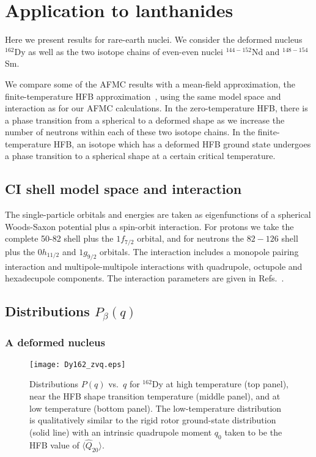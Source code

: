 \documentclass[prc,twocolumn,aps,showpacs,floatfix,nofootinbib,letterpaper,preprintnumbers]{revtex4-1}
\begin{document}
\section{Application to lanthanides}\label{application}

Here we present results for rare-earth nuclei. We consider the deformed nucleus $^{162}$Dy as well as the two isotope chains of even-even nuclei $^{144-152}$Nd and $^{148-154}$Sm.

 We compare some of the AFMC results with a mean-field approximation, the finite-temperature HFB approximation~\cite{go81,ta81}, using the same model space and interaction as for our AFMC calculations. In the zero-temperature HFB, there is a phase transition from a spherical to a deformed shape as we increase the number of neutrons within each of these two isotope chains. In the finite-temperature HFB, an isotope which has a deformed HFB ground state undergoes a phase transition to a spherical shape at a certain critical temperature. 
 
\subsection{CI shell model space and interaction}
 
The single-particle orbitals and energies are taken as eigenfunctions of a spherical Woods-Saxon potential plus a
spin-orbit interaction. For protons we take the complete 50-82 
shell plus the $1f_{7/2}$ orbital, and for neutrons the $82-126$ shell plus
the $0h_{11/2}$ and $1g_{9/2}$ orbitals.  The interaction includes a monopole pairing interaction and multipole-multipole interactions with quadrupole, octupole and hexadecupole components.  The interaction parameters are given in Refs.~\cite{al08,oz13}.

\subsection{Distributions $P_\beta(q)$}

\subsubsection{ A deformed nucleus}

\begin{figure}[htb]
    \texttt{[image: Dy162\_zvq.eps]}
    \caption{Distributions $P(q)$ vs.~$q$ for $^{162}$Dy at high temperature (top panel), near the HFB shape transition temperature (middle panel), and at low temperature (bottom panel). The low-temperature distribution is qualitatively similar to the rigid rotor ground-state distribution (solid line) with an intrinsic quadrupole moment $q_0$ taken to be the HFB value of $\langle \hat{Q}_{2 0}\rangle$. }
\label{dy162_zvq_temp}
\end{figure} 
\end{document}
